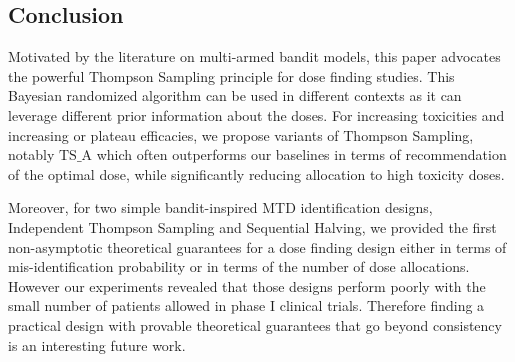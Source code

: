 
\subsection{Conclusion}\label{sec:Conclusion}
Motivated by the literature on multi-armed bandit models, this paper advocates the powerful Thompson Sampling principle for dose finding studies. This Bayesian randomized algorithm can be used in different contexts as it can leverage different prior information about the doses. For increasing toxicities and increasing or plateau efficacies, we propose variants of Thompson Sampling, notably $\mathrm{TS}\_\mathrm{A}$ which often outperforms our baselines in terms of recommendation of the optimal dose, while significantly reducing allocation to high toxicity doses. 

Moreover, for two simple bandit-inspired MTD identification designs, Independent Thompson Sampling and Sequential Halving, we provided the first non-asymptotic theoretical guarantees for a dose finding design either in terms of mis-identification probability or in terms of the number of dose allocations. However our experiments revealed that those designs perform poorly with the small number of patients allowed in phase I clinical trials. Therefore finding a practical design with provable theoretical guarantees that go beyond consistency is an interesting future work. %




